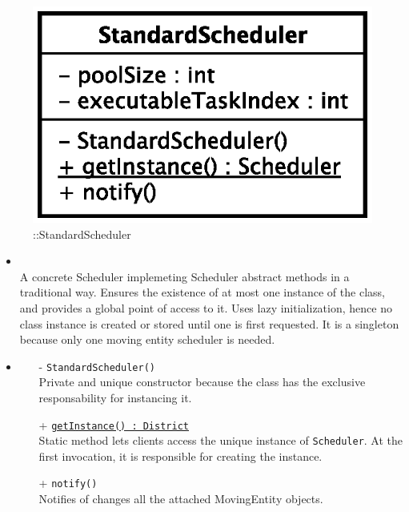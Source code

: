 \begin{figure}[h]
\centering
\includegraphics[scale=0.6,keepaspectratio]{images/solution/standard_scheduler.eps}
\caption{\pScheduling::StandardScheduler}
\label{fig:sd-app-scheduling-standard-scheduler}
\end{figure}
\FloatBarrier
\begin{itemize}
  \item \textbf{\descr} \\
    A concrete Scheduler implemeting Scheduler abstract methods in a traditional way.
    Ensures the existence of at most one instance of the class, 
 	and provides a global point of access to it.
  	Uses lazy initialization, hence no class instance is created 
  	or stored until one is first requested.
    It is a singleton because only one moving entity scheduler is needed.
  \item \textbf{\ops}
  \begin{itemize}
    \item[-] \texttt{StandardScheduler()} \\
    Private and unique constructor because the class has the exclusive 
    responsability for instancing it.
    \item[+] \texttt{\underline{getInstance() : District}} \\
    Static method lets clients access the unique instance 
    of \texttt{Scheduler}. At the first invocation, it is responsible 
    for creating the instance.
    \item[+] \texttt{notify()} \\
	Notifies of changes all the attached MovingEntity objects.
  \end{itemize}
\end{itemize}
